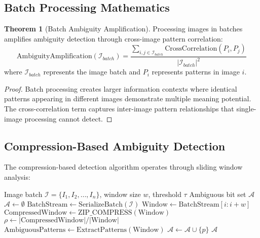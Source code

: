 \documentclass[12pt,a4paper]{article}
\theoremstyle{definition}
\newtheorem{theorem}{Theorem}
\begin{document}
\subsection{Batch Processing Mathematics}

\begin{theorem}[Batch Ambiguity Amplification]
Processing images in batches amplifies ambiguity detection through cross-image pattern correlation:
\begin{equation}
\text{AmbiguityAmplification}(\mathcal{I}_{batch}) = \frac{\sum_{i,j \in \mathcal{I}_{batch}} \text{CrossCorrelation}(P_i, P_j)}{|\mathcal{I}_{batch}|^2}
\end{equation}
where $\mathcal{I}_{batch}$ represents the image batch and $P_i$ represents patterns in image $i$.
\end{theorem}

\begin{proof}
Batch processing creates larger information contexts where identical patterns appearing in different images demonstrate multiple meaning potential. The cross-correlation term captures inter-image pattern relationships that single-image processing cannot detect.
\end{proof}

\subsection{Compression-Based Ambiguity Detection}

The compression-based detection algorithm operates through sliding window analysis:

\begin{algorithm}[H]
\caption{Batch Compression Ambiguity Detection}
\begin{algorithmic}[1]
\REQUIRE Image batch $\mathcal{I} = \{I_1, I_2, \ldots, I_n\}$, window size $w$, threshold $\tau$
\ENSURE Ambiguous bit set $\mathcal{A}$
\STATE $\mathcal{A} \leftarrow \emptyset$
\STATE $\text{BatchStream} \leftarrow \text{SerializeBatch}(\mathcal{I})$
    \STATE $\text{Window} \leftarrow \text{BatchStream}[i:i+w]$
    \STATE $\text{CompressedWindow} \leftarrow \text{ZIP\_COMPRESS}(\text{Window})$
    \STATE $\rho \leftarrow |\text{CompressedWindow}|/|\text{Window}|$
    \IF{$\rho > \tau$}
        \STATE $\text{AmbiguousPatterns} \leftarrow \text{ExtractPatterns}(\text{Window})$
                \STATE $\mathcal{A} \leftarrow \mathcal{A} \cup \{p\}$
            \ENDIF
        \ENDFOR
    \ENDIF
\ENDFOR
\RETURN $\mathcal{A}$
\end{algorithmic}
\end{algorithm}
\end{document}
